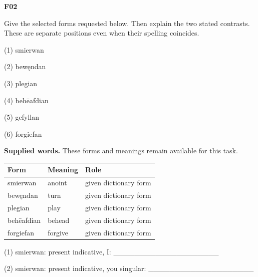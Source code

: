 \par\begin{minipage}{\linewidth}\raggedright
\textbf{F02}

Give the selected forms requested below. Then explain the two stated contrasts. These are separate positions even when their spelling coincides.

(1) smierwan

(2) bewęndan

(3) plegian

(4) behēafdian

(5) gefyllan

(6) forgiefan

\textbf{Supplied words.} These forms and meanings remain available for this task.

\par\begingroup
\fontsize{10.5}{13.2}\selectfont
\setlength{\LTleft}{0pt}\setlength{\LTright}{\fill}
\noindent
\begin{tabular}{@{}>{\raggedright\arraybackslash}p{33.87mm}>{\raggedright\arraybackslash}p{33.87mm}>{\raggedright\arraybackslash}p{50.64mm}@{}}
\toprule
\textbf{Form} & \textbf{Meaning} & \textbf{Role} \\
\midrule
smierwan & anoint & given dictionary form \\
bewęndan & turn & given dictionary form \\
plegian & play & given dictionary form \\
behēafdian & behead & given dictionary form \\
forgiefan & forgive & given dictionary form \\
\bottomrule
\end{tabular}
\par\endgroup

(1) smierwan: present indicative, I: \_\_\_\_\_\_\_\_\_\_\_\_\_\_\_\_\_\_\_\_

(2) smierwan: present indicative, you singular: \_\_\_\_\_\_\_\_\_\_\_\_\_\_\_\_\_\_\_\_


\end{minipage}
